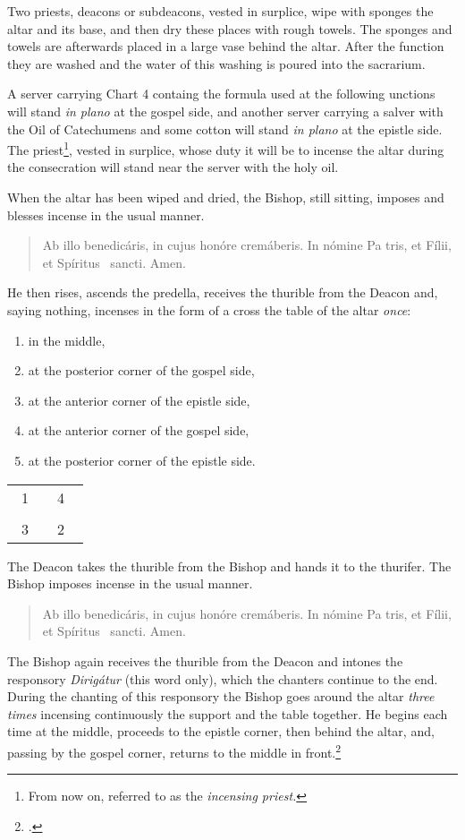 \documentclass[letterpaper]{report}
\newcommand\blessincense{
\begin{quote}
   Ab illo benedicáris, in cujus honóre cremáberis. In nómine Pa\cross
    tris, et Fí\cross lii, et Spíritus \cross\ sancti. \rbar Amen.
\end{quote}
}
\newcommand\crossplan{
\begin{center}
    \begin{tabular}{ | l c r | }
       \hline
        \cross\ {\tiny 1} &         & {\tiny 4} \cross\ \\
                           & \cross &           \\
        \cross\ {\tiny 3} &         & {\tiny 2} \cross\ \\
       \hline
   \end{tabular} 
\end{center}
}
\begin{document}
{    \rubric Two priests, deacons or subdeacons, vested in surplice, wipe with
    sponges the altar and its base, and then dry these places with rough
    towels. The sponges and towels are afterwards placed in a large vase behind
    the altar. After the function they are washed and the water of this washing
    is poured into the sacrarium.

    A server carrying Chart 4 containg the formula used at the following
    unctions will stand \textit{in plano} at the gospel side, and another
    server carrying a salver with the Oil of Catechumens and some cotton will
    stand \textit{in plano} at the epistle side. The priest\footnote{From now
    on, referred to as the \textit{incensing priest.}}, vested in surplice,
    whose duty it will be to incense the altar during the consecration will
    stand near the server with the holy oil.

    \rubric When the altar has been wiped and dried, the Bishop, still sitting,
    imposes and blesses incense in the usual manner. 

    \blessincense

    He then rises, ascends the predella, receives the thurible from the Deacon
    and, saying nothing, incenses in the form of a cross the table of the altar
    \textit{once}: 

    \begin{enumerate}
        \item in the middle,
        \item at the posterior corner of the gospel side,
        \item at the anterior corner of the epistle side,
        \item at the anterior corner of the gospel side,
        \item at the posterior corner of the epistle side.
    \end{enumerate}

    \crossplan

    \rubric The Deacon takes the thurible from the Bishop and hands it to the
    thurifer. The Bishop imposes incense in the usual manner.

    \blessincense

    The Bishop again receives the thurible from the Deacon and intones the
    responsory \textit{Dirig\'atur} (this word only), which the chanters
    continue to the end. During the chanting of this responsory the Bishop goes
    around the altar \textit{three times} incensing continuously the support
    and the table together. He begins each time at the middle, proceeds to the
    epistle corner, then behind the altar, and, passing by the gospel corner,
    returns to the middle in front.\footcite[If the back of the altar is
    attached to the wall, he begins at the middle, incenses the support as fas
    as the epistle corner, afterwards the table from the epistle to the gospel
    side, then the side of the altar at the gospel side, then the side of the
    altar at the gospel corner and finally the support from the gospel corner
    to the middle.][footnote 1, p. 96.]{consecranda}

}
\end{document}

